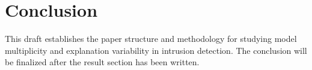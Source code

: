 \section{Conclusion}

This draft establishes the paper structure and methodology for studying model multiplicity and explanation variability in intrusion detection. The conclusion will be finalized after the result section has been written.

